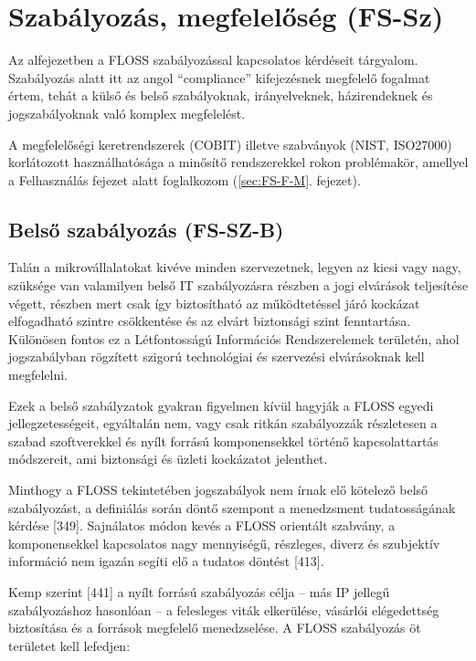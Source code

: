 \documentclass[12pt,magyar,a4paper,oneside]{scrreprt}
\begin{document}
\hypertarget{sec:FS-SZ}{%
\section{Szabályozás, megfelelőség (FS-Sz)}\label{sec:FS-SZ}}

Az alfejezetben a FLOSS szabályozással kapcsolatos kérdéseit tárgyalom.
Szabályozás alatt itt az angol ``compliance'' kifejezésnek megfelelő
fogalmat értem, tehát a külső és belső szabályoknak, irányelveknek,
házirendeknek és jogszabályoknak való komplex megfelelést.

A megfelelőségi keretrendszerek (COBIT) illetve szabványok (NIST,
ISO27000) korlátozott használhatósága a minősítő rendszerekkel rokon
problémakör, amellyel a Felhasználás fejezet alatt foglalkozom
(\ref{sec:FS-F-M}. fejezet).

\hypertarget{sec:FS-SZ-B}{%
\subsection{Belső szabályozás (FS-SZ-B)}\label{sec:FS-SZ-B}}

Talán a mikrovállalatokat kivéve minden szervezetnek, legyen az kicsi
vagy nagy, szüksége van valamilyen belső IT szabályozásra részben a jogi
elvárások teljesítése végett, részben mert csak így biztosítható az
működtetéssel járó kockázat elfogadható szintre csökkentése és az elvárt
biztonsági szint fenntartása. Különösen fontos ez a Létfontosságú
Információs Rendszerelemek területén, ahol jogszabályban rögzített
szigorú technológiai és szervezési elvárásoknak kell megfelelni.

Ezek a belső szabályzatok gyakran figyelmen kívül hagyják a FLOSS egyedi
jellegzetességeit, egyáltalán nem, vagy csak ritkán szabályozzák
részletesen a szabad szoftverekkel és nyílt forrású komponensekkel
történő kapcsolattartás módszereit, ami biztonsági és üzleti kockázatot
jelenthet.

Minthogy a FLOSS tekintetében jogszabályok nem írnak elő kötelező belső
szabályozást, a definiálás során döntő szempont a menedzsment
tudatosságának kérdése {[}349{]}. Sajnálatos módon kevés a FLOSS
orientált szabvány, a komponensekkel kapcsolatos nagy mennyiségű,
részleges, diverz és szubjektív információ nem igazán segíti elő a
tudatos döntést {[}413{]}.

Kemp szerint {[}441{]} a nyílt forrású szabályozás célja -- más IP
jellegű szabályozáshoz hasonlóan -- a felesleges viták elkerülése,
vásárlói elégedettség biztosítása és a források megfelelő menedzselése.
A FLOSS szabályozás öt területet kell lefedjen:
\end{document}
